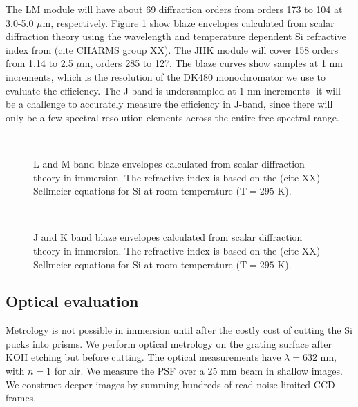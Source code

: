 The LM module will have about 69 diffraction orders from orders 173 to 104 at 3.0-5.0 $\mu$m, respectively.  Figure \ref{fig:LMbandcalc} show blaze envelopes calculated from scalar diffraction theory using the wavelength and temperature dependent Si refractive index from (cite CHARMS group XX).  The JHK module will cover 158 orders from 1.14 to 2.5 $\mu$m, orders 285 to 127.  The blaze curves show samples at 1 nm increments, which is the resolution of the DK480 monochromator we use to evaluate the efficiency.  The J-band is undersampled at 1 nm increments- it will be a challenge to accurately measure the efficiency in J-band, since there will only be a few spectral resolution elements across the entire free spectral range.

\begin{figure}[htb] 
\begin{center}
\
\caption[Calculated $L-$ and $M-$ band blaze envelopes for iSHELL]{ L and M band blaze envelopes calculated from scalar diffraction theory in immersion.  The refractive index is based on the (cite XX) Sellmeier equations for Si at room temperature (T$=295$ K).}
\label{fig:LMbandcalc}
\end{center}
\end{figure}

\begin{figure}[htb] 
\begin{center}
\
\caption[Calculated $J-$ and $K-$ band blaze envelopes for iSHELL]{ J and K band blaze envelopes calculated from scalar diffraction theory in immersion.  The refractive index is based on the (cite XX) Sellmeier equations for Si at room temperature (T$=295$ K).}
\label{fig:JKbandcalc}
\end{center}
\end{figure}

\subsection{Optical evaluation}
Metrology is not possible in immersion until after the costly cost of cutting the Si pucks into prisms.  We perform optical metrology on the grating surface after KOH etching but before cutting.  The optical measurements have $\lambda=632$ nm, with $n=1$ for air.  We measure the PSF over a 25 mm beam in shallow images.  We construct deeper images by summing hundreds of read-noise limited CCD frames.
